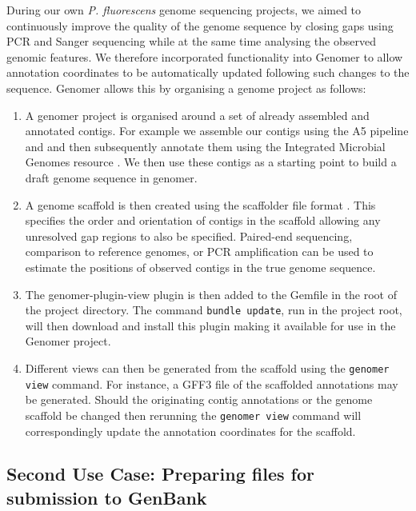 \documentclass[10pt]{article}
\begin{document}
During our own \emph{P. fluorescens} genome sequencing projects, we aimed to
continuously improve the quality of the genome sequence by closing gaps using
PCR and Sanger sequencing while at the same time analysing the observed genomic
features. We therefore incorporated functionality into Genomer to allow
annotation coordinates to be automatically updated following such changes to
the sequence. Genomer allows this by organising a genome project as follows:

\begin{enumerate}

\item{A genomer project is organised around a set of already assembled and
annotated contigs. For example we assemble our contigs using the A5 pipeline
\cite{tritt2012} and and then subsequently annotate them using the Integrated
Microbial Genomes resource \cite{markowitz2006}. We then use these contigs as a
starting point to build a draft genome sequence in genomer.}

\item{A genome scaffold is then created using the scaffolder file format
\cite{barton2012}. This specifies the order and orientation of contigs in the
scaffold allowing any unresolved gap regions to also be specified. Paired-end
sequencing, comparison to reference genomes, or PCR amplification can be used
to estimate the positions of observed contigs in the true genome sequence.}
  
\item{The genomer-plugin-view plugin is then added to the Gemfile in the root
of the project directory. The command \verb+bundle update+, run in the project
root, will then download and install this plugin making it available for use in
the Genomer project.}
  
\item{Different views can then be generated from the scaffold using the
\verb+genomer view+ command. For instance, a GFF3 file of the scaffolded
annotations may be generated. Should the originating contig annotations or the
genome scaffold be changed then rerunning the \verb+genomer view+ command will
correspondingly update the annotation coordinates for the scaffold.}

\end{enumerate}
  
\subsection*{Second Use Case: Preparing files for submission to GenBank}
\end{document}

